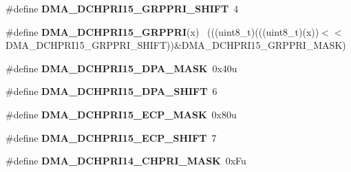 \begin{DoxyCompactItemize}
\item 
\hypertarget{group___d_m_a___register___masks_ga668564fb6272c4cdf6b7261105afa12a}{}\#define {\bfseries D\+M\+A\+\_\+\+D\+C\+H\+P\+R\+I15\+\_\+\+G\+R\+P\+P\+R\+I\+\_\+\+S\+H\+I\+F\+T}~4\label{group___d_m_a___register___masks_ga668564fb6272c4cdf6b7261105afa12a}

\item 
\hypertarget{group___d_m_a___register___masks_ga867c3676921a99f44c815d799dd0306c}{}\#define {\bfseries D\+M\+A\+\_\+\+D\+C\+H\+P\+R\+I15\+\_\+\+G\+R\+P\+P\+R\+I}(x)                                  ~(((uint8\+\_\+t)(((uint8\+\_\+t)(x))$<$$<$D\+M\+A\+\_\+\+D\+C\+H\+P\+R\+I15\+\_\+\+G\+R\+P\+P\+R\+I\+\_\+\+S\+H\+I\+F\+T))\&D\+M\+A\+\_\+\+D\+C\+H\+P\+R\+I15\+\_\+\+G\+R\+P\+P\+R\+I\+\_\+\+M\+A\+S\+K)\label{group___d_m_a___register___masks_ga867c3676921a99f44c815d799dd0306c}

\item 
\hypertarget{group___d_m_a___register___masks_ga3b39c6e0610362d59e6ff055e29f0192}{}\#define {\bfseries D\+M\+A\+\_\+\+D\+C\+H\+P\+R\+I15\+\_\+\+D\+P\+A\+\_\+\+M\+A\+S\+K}~0x40u\label{group___d_m_a___register___masks_ga3b39c6e0610362d59e6ff055e29f0192}

\item 
\hypertarget{group___d_m_a___register___masks_gad352f5ccc0fe19ea638ea2430ccc3afb}{}\#define {\bfseries D\+M\+A\+\_\+\+D\+C\+H\+P\+R\+I15\+\_\+\+D\+P\+A\+\_\+\+S\+H\+I\+F\+T}~6\label{group___d_m_a___register___masks_gad352f5ccc0fe19ea638ea2430ccc3afb}

\item 
\hypertarget{group___d_m_a___register___masks_ga61fa9d2c60ec0993ecf63e1a3ed62e79}{}\#define {\bfseries D\+M\+A\+\_\+\+D\+C\+H\+P\+R\+I15\+\_\+\+E\+C\+P\+\_\+\+M\+A\+S\+K}~0x80u\label{group___d_m_a___register___masks_ga61fa9d2c60ec0993ecf63e1a3ed62e79}

\item 
\hypertarget{group___d_m_a___register___masks_ga54aaf25e501504bf8a36a571670118c2}{}\#define {\bfseries D\+M\+A\+\_\+\+D\+C\+H\+P\+R\+I15\+\_\+\+E\+C\+P\+\_\+\+S\+H\+I\+F\+T}~7\label{group___d_m_a___register___masks_ga54aaf25e501504bf8a36a571670118c2}

\item 
\hypertarget{group___d_m_a___register___masks_ga908ef8df8e7d76968f5aec7100551634}{}\#define {\bfseries D\+M\+A\+\_\+\+D\+C\+H\+P\+R\+I14\+\_\+\+C\+H\+P\+R\+I\+\_\+\+M\+A\+S\+K}~0x\+Fu\label{group___d_m_a___register___masks_ga908ef8df8e7d76968f5aec7100551634}


\end{DoxyCompactItemize}
